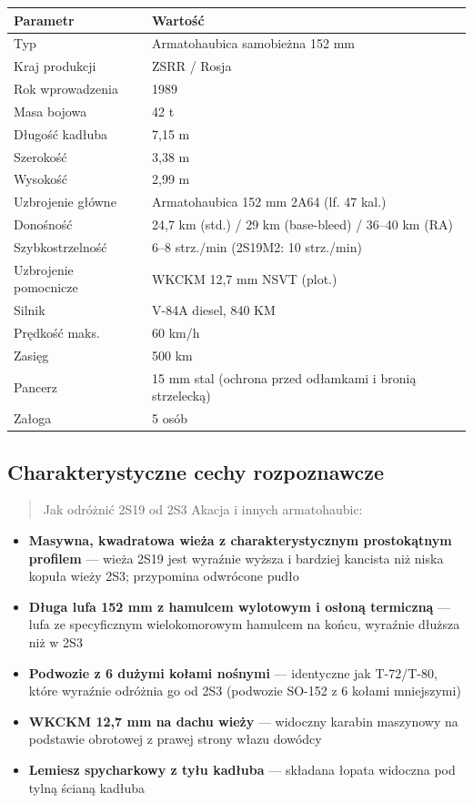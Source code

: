 \documentclass[12pt,oneside]{book}
\providecommand{\tightlist}{%
  \setlength{\itemsep}{0pt}\setlength{\parskip}{0pt}}
\begin{document}
\begin{longtable}[]{@{}ll@{}}
\toprule\noalign{}
Parametr & Wartość \\
\midrule\noalign{}
\endhead
\bottomrule\noalign{}
\endlastfoot
Typ & Armatohaubica samobieżna 152 mm \\
Kraj produkcji & ZSRR / Rosja \\
Rok wprowadzenia & 1989 \\
Masa bojowa & 42 t \\
Długość kadłuba & 7,15 m \\
Szerokość & 3,38 m \\
Wysokość & 2,99 m \\
Uzbrojenie główne & Armatohaubica 152 mm 2A64 (lf. 47 kal.) \\
Donośność & 24,7 km (std.) / 29 km (base-bleed) / 36--40 km (RA) \\
Szybkostrzelność & 6--8 strz./min (2S19M2: 10 strz./min) \\
Uzbrojenie pomocnicze & WKCKM 12,7 mm NSVT (plot.) \\
Silnik & V-84A diesel, 840 KM \\
Prędkość maks. & 60 km/h \\
Zasięg & 500 km \\
Pancerz & 15 mm stal (ochrona przed odłamkami i bronią strzelecką) \\
Załoga & 5 osób \\
\end{longtable}

\subsection{Charakterystyczne cechy
rozpoznawcze}\label{charakterystyczne-cechy-rozpoznawcze-18}

\begin{quote}
Jak odróżnić 2S19 od 2S3 Akacja i innych armatohaubic:
\end{quote}

\begin{itemize}
\tightlist
\item
  \textbf{Masywna, kwadratowa wieża z charakterystycznym prostokątnym
  profilem} --- wieża 2S19 jest wyraźnie wyższa i bardziej kancista niż
  niska kopuła wieży 2S3; przypomina odwrócone pudło
\item
  \textbf{Długa lufa 152 mm z hamulcem wylotowym i osłoną termiczną} ---
  lufa ze specyficznym wielokomorowym hamulcem na końcu, wyraźnie
  dłuższa niż w 2S3
\item
  \textbf{Podwozie z 6 dużymi kołami nośnymi} --- identyczne jak
  T-72/T-80, które wyraźnie odróżnia go od 2S3 (podwozie SO-152 z 6
  kołami mniejszymi)
\item
  \textbf{WKCKM 12,7 mm na dachu wieży} --- widoczny karabin maszynowy
  na podstawie obrotowej z prawej strony włazu dowódcy
\item
  \textbf{Lemiesz spycharkowy z tyłu kadłuba} --- składana łopata
  widoczna pod tylną ścianą kadłuba
\end{itemize}
\end{document}
